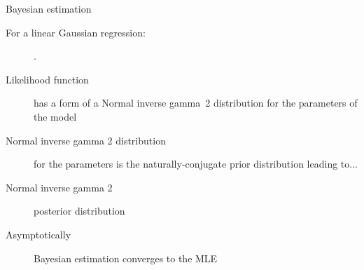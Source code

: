 \documentclass[notes,blackandwhite,mathsans]{beamer}
\begin{document}
{
\begin{frame}{Bayesian estimation}

\begin{description}
\item[{\color{mcxs3}For a linear Gaussian regression:}] {\color{mcxs1}.}

\bigskip\item[{\color{mcxs3}Likelihood function}] {\color{mcxs2}has a form of a Normal inverse gamma~2 distribution for the parameters of the model}

\smallskip\item[{\color{mcxs3}Normal inverse gamma 2 distribution}] {\color{mcxs2}for the parameters is the naturally-conjugate prior distribution leading to...}

\smallskip\item[{\color{mcxs3}Normal inverse gamma 2}] {\color{mcxs2}posterior distribution}

\smallskip\item[{\color{mcxs3}Asymptotically}] {\color{mcxs2}Bayesian estimation converges to the MLE}
\end{description}

\end{frame}
}
\end{document}
